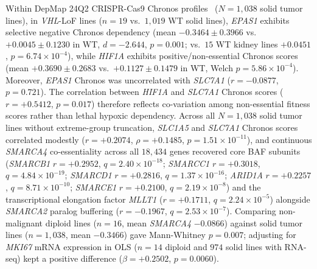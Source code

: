 \documentclass[11pt]{article}
\begin{document}
Within DepMap 24Q2 CRISPR-Cas9 Chronos profiles~\cite{depmap2021} ($N = 1,038$ solid tumor lines), in \textit{VHL}-LoF lines ($n = 19$ vs.\ $1,019$ WT solid lines), \textit{EPAS1} exhibits selective negative Chronos dependency (mean $-0.3464 \pm 0.3966$ vs.\ $+0.0045 \pm 0.1230$ in WT, $d = -2.644$, $p = 0.001$; vs.\ $15$ WT kidney lines $+0.0451$, $p = 6.74 \times 10^{-4}$), while \textit{HIF1A} exhibits positive/non-essential Chronos scores (mean $+0.3690 \pm 0.2683$ vs.\ $+0.1127 \pm 0.1479$ in WT, Welch $p = 5.86 \times 10^{-4}$). Moreover, \textit{EPAS1} Chronos was uncorrelated with \textit{SLC7A1} ($r = -0.0877$, $p = 0.721$). The correlation between \textit{HIF1A} and \textit{SLC7A1} Chronos scores ($r = +0.5412$, $p = 0.017$) therefore reflects co-variation among non-essential fitness scores rather than lethal hypoxic dependency. Across all $N = 1,038$ solid tumor lines without extreme-group truncation, \textit{SLC1A5} and \textit{SLC7A1} Chronos scores correlated modestly ($r = +0.2074$, $\rho = +0.1485$, $p = 1.51 \times 10^{-11}$), and continuous \textit{SMARCA4} co-essentiality across all $18,434$ genes recovered core BAF subunits (\textit{SMARCB1} $r = +0.2952$, $q = 2.40 \times 10^{-18}$; \textit{SMARCC1} $r = +0.3018$, $q = 4.84 \times 10^{-19}$; \textit{SMARCD1} $r = +0.2816$, $q = 1.37 \times 10^{-16}$; \textit{ARID1A} $r = +0.2257$, $q = 8.71 \times 10^{-10}$; \textit{SMARCE1} $r = +0.2100$, $q = 2.19 \times 10^{-8}$) and the transcriptional elongation factor \textit{MLLT1} ($r = +0.1711$, $q = 2.24 \times 10^{-5}$) alongside \textit{SMARCA2} paralog buffering ($r = -0.1967$, $q = 2.53 \times 10^{-7}$). Comparing non-malignant diploid lines ($n = 16$, mean \textit{SMARCA4} $-0.0866$) against solid tumor lines ($n = 1,038$, mean $-0.3466$) gave Mann-Whitney $p = 0.007$; adjusting for \textit{MKI67} mRNA expression in OLS ($n = 14$ diploid and $974$ solid lines with RNA-seq) kept a positive difference ($\beta = +0.2502$, $p = 0.0060$).
\end{document}
